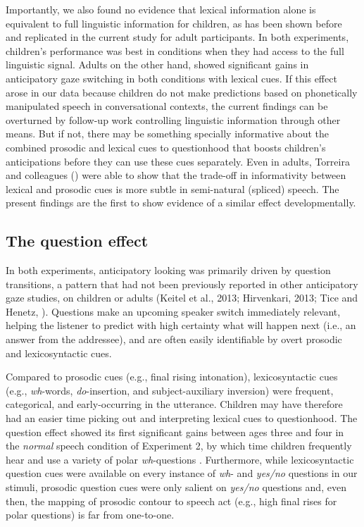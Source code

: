 \documentclass[authoryear, 12pt]{elsarticle}
\begin{document}
Importantly, we also found no evidence that lexical information alone is equivalent to full linguistic information for children, as has been shown before \citep{magyari2012, de-ruiter2006} and replicated in the current study for adult participants. In both experiments, children's performance was best in conditions when they had access to the full linguistic signal. Adults on the other hand, showed significant gains in anticipatory gaze switching in both conditions with lexical cues. If this effect arose in our data because children do not make predictions based on phonetically manipulated speech in conversational contexts, the current findings can be overturned by follow-up work controlling linguistic information through other means. But if not, there may be something specially informative about the combined prosodic and lexical cues to questionhood that boosts children's anticipations before they can use these cues separately. Even in adults, Torreira and colleagues (\citeyear{torreira2015}) were able to show that the trade-off in informativity between lexical and prosodic cues is more subtle in semi-natural (spliced) speech. The present findings are the first to show evidence of a similar effect developmentally.

\subsection{The question effect}

In both experiments, anticipatory looking was primarily driven by question transitions, a pattern that had not been previously reported in other anticipatory gaze studies, on children or adults (Keitel et al., 2013; Hirvenkari, 2013; Tice and Henetz, \citeyear{TiceHenetz11}). Questions make an upcoming speaker switch immediately relevant, helping the listener to predict with high certainty what will happen next (i.e., an answer from the addressee), and are often easily identifiable by overt prosodic and lexicosyntactic cues.

Compared to prosodic cues (e.g., final rising intonation), lexicosyntactic cues (e.g., \textit{wh}-words, \textit{do}-insertion, and subject-auxiliary inversion) were frequent, categorical, and early-occurring in the utterance. Children may have therefore had an easier time picking out and interpreting lexical cues to questionhood. The question effect showed its first significant gains between ages three and four in the \textit{normal} speech condition of Experiment 2, by which time children frequently hear and use a variety of polar \textit{wh}-questions \citep{clark2009}. Furthermore, while lexicosyntactic question cues were available on every instance of \textit{wh}- and \textit{yes/no} questions in our stimuli, prosodic question cues were only salient on \textit{yes/no} questions and, even then, the mapping of prosodic contour to speech act (e.g., high final rises for polar questions) is far from one-to-one.
\end{document}
